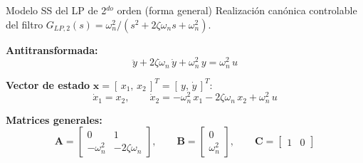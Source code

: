 \documentclass[aspectratio=169,t]{beamer}
\begin{document}
\begin{frame}{Modelo SS del LP de 2$^{do}$ orden (forma general)}
{\small\color{uncGray}Realización canónica controlable del filtro $G_{LP,2}(s)=\omega_n^2/(s^2+2\zeta\omega_n s + \omega_n^2)$.}\par
\vspace{2mm}

\textbf{Antitransformada:}
\begin{equation*}
\ddot y + 2\zeta\omega_n\,\dot y + \omega_n^{2}\,y = \omega_n^{2}\,u
\end{equation*}

\textbf{Vector de estado} $\bm{x} = [\,x_1,\,x_2\,]^T = [\,y,\,\dot y\,]^T$:
\begin{equation*}
\dot x_1 = x_2,
\qquad
\dot x_2 = -\omega_n^{2}\,x_1 - 2\zeta\omega_n\,x_2 + \omega_n^{2}\,u
\end{equation*}

\textbf{Matrices generales:}
\begin{equation*}
\bm{A} = \begin{bmatrix} 0 & 1 \\ -\omega_n^{2} & -2\zeta\omega_n \end{bmatrix},
\qquad
\bm{B} = \begin{bmatrix} 0 \\ \omega_n^{2} \end{bmatrix},
\qquad
\bm{C} = \begin{bmatrix} 1 & 0 \end{bmatrix}
\end{equation*}
\end{frame}
\end{document}
